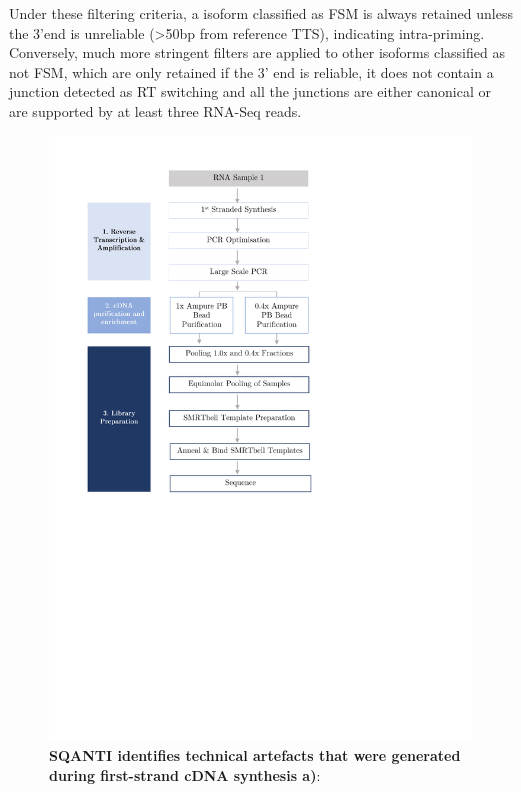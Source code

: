 Under these filtering criteria, a isoform classified as FSM is always retained unless the 3'end is unreliable (>50bp from reference TTS), indicating intra-priming. Conversely, much more stringent filters are applied to other isoforms classified as not FSM, which are only retained if the 3' end is reliable, it does not contain a junction detected as RT switching and all the junctions are either canonical or are supported by at least three RNA-Seq reads.   

\begin{figure}[!h]
	\begin{center}
		\includegraphics[page=19,trim={0 12cm 0 0},clip, scale = 0.8]{Figures/ProjectDevelopment_Figures.pdf}
	\end{center}
	\captionsetup{width=0.95\textwidth}
	\caption[Technical artefacts generated during library preparation and identified in SQANTI]%
	{\textbf{SQANTI identifies technical artefacts that were generated during first-strand cDNA synthesis a)}: }
	\label{fig:sqantifiltering}
\end{figure}




